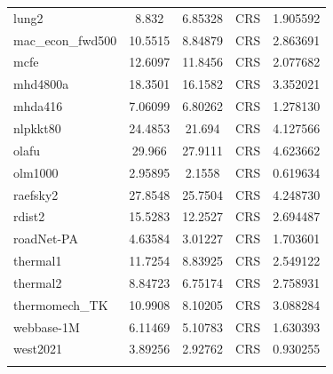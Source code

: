 \documentclass[12pt,oneside]{book} %
\begin{document}
\begin{longtable}{lcccr}
    lung2             & 8.832        & 6.85328          & CRS                     & 1.905592         \\
    mac\_econ\_fwd500 & 10.5515      & 8.84879          & CRS                     & 2.863691         \\
    mcfe              & 12.6097      & 11.8456          & CRS                     & 2.077682         \\
    mhd4800a          & 18.3501      & 16.1582          & CRS                     & 3.352021         \\
    mhda416           & 7.06099      & 6.80262          & CRS                     & 1.278130         \\
    nlpkkt80          & 24.4853      & 21.694           & CRS                     & 4.127566         \\
    olafu             & 29.966       & 27.9111          & CRS                     & 4.623662         \\
    olm1000           & 2.95895      & 2.1558           & CRS                     & 0.619634         \\
    raefsky2          & 27.8548      & 25.7504          & CRS                     & 4.248730         \\
    rdist2            & 15.5283      & 12.2527          & CRS                     & 2.694487         \\
    roadNet-PA        & 4.63584      & 3.01227          & CRS                     & 1.703601         \\
    thermal1          & 11.7254      & 8.83925          & CRS                     & 2.549122         \\
    thermal2          & 8.84723      & 6.75174          & CRS                     & 2.758931         \\
    thermomech\_TK    & 10.9908      & 8.10205          & CRS                     & 3.088284         \\
    webbase-1M        & 6.11469      & 5.10783          & CRS                     & 1.630393         \\
    west2021          & 3.89256      & 2.92762          & CRS                     & 0.930255         \\                                                                               \\
\end{longtable}
\end{document}
